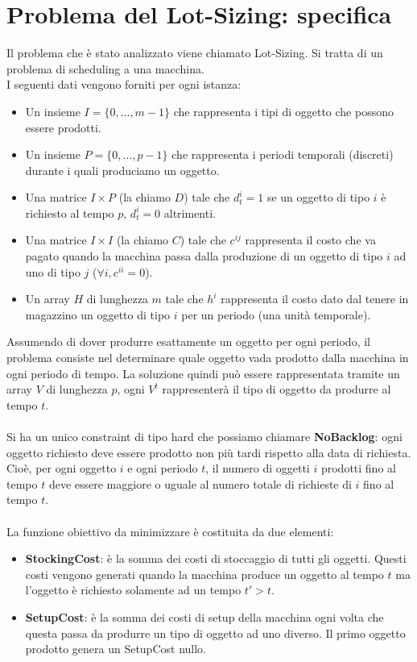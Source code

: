 \documentclass[12pt]{article}
\begin{document}
\section*{Problema del Lot-Sizing: specifica}
Il problema che è stato analizzato viene chiamato Lot-Sizing. Si tratta di un problema di scheduling a una macchina.\\
I seguenti dati vengono forniti per ogni istanza:
\begin{itemize}
\item Un insieme $I=\{0,\dots,m-1\}$ che rappresenta i tipi di oggetto che possono essere prodotti.
\item Un insieme $P=\{0,\dots,p-1\}$ che rappresenta i periodi temporali (discreti) durante i quali produciamo un oggetto.
\item Una matrice $I\times P$ (la chiamo $D$) tale che $d^i_t=1$ se un oggetto di tipo $i$ è richiesto al tempo $p$, $d^i_t=0$ altrimenti.
\item Una matrice $I\times I$ (la chiamo $C$) tale che $c^{ij}$ rappresenta il costo che va pagato quando la macchina passa dalla produzione di un oggetto di tipo $i$ ad uno di tipo $j$ ($\forall i,c^{ii}=0$).
\item Un array $H$ di lunghezza $m$ tale che $h^i$ rappresenta il costo dato dal tenere in magazzino un oggetto di tipo $i$ per un periodo (una unità temporale).
\end{itemize}
Assumendo di dover produrre esattamente un oggetto per ogni periodo, il problema consiste nel determinare quale oggetto vada prodotto dalla macchina in ogni periodo di tempo. La soluzione quindi può essere rappresentata tramite un array $V$ di lunghezza $p$, ogni $V^t$ rappresenterà il tipo di oggetto da produrre al tempo $t$.\\\\
Si ha un unico constraint di tipo hard che possiamo chiamare \textbf{NoBacklog}: ogni oggetto richiesto deve essere prodotto non più tardi rispetto alla data di richiesta. Cioè, per ogni oggetto $i$ e ogni periodo $t$, il numero di oggetti $i$ prodotti fino al tempo $t$ deve essere maggiore o uguale al numero totale di richieste di $i$ fino al tempo $t$.\\\\
La funzione obiettivo da minimizzare è costituita da due elementi:
\begin{itemize}
\item \textbf{StockingCost}: è la somma dei costi di stoccaggio di tutti gli oggetti. Questi costi vengono generati quando la macchina produce un oggetto al tempo $t$ ma l'oggetto è richiesto solamente ad un tempo $t'>t$.
\item \textbf{SetupCost}: è la somma dei costi di setup della macchina ogni volta che questa passa da produrre un tipo di oggetto ad uno diverso. Il primo oggetto prodotto genera un SetupCost nullo.
\end{itemize}
\end{document}
